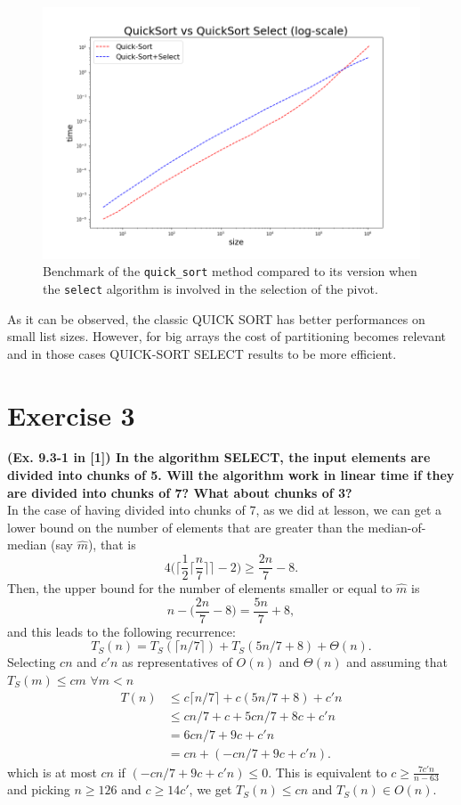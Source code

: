 \documentclass{article}
\begin{document}
	\begin{figure}[h]
		\centering
		\includegraphics[width=.8\textwidth]{../plot/quicksort.png}  
		\caption{Benchmark of the \texttt{quick\_sort} method compared to its version when the \texttt{select} algorithm is involved in the selection of the pivot.}
		\label{plot}
	\end{figure}
	
	\noindent As it can be observed, the classic QUICK SORT has better performances on small list sizes. However, for big arrays the cost of partitioning becomes relevant and in those cases QUICK-SORT SELECT results to be more efficient.
	
	
	\section*{Exercise 3}
	\textbf{(Ex. 9.3-1 in [1]) In the algorithm SELECT, the input elements are divided into chunks of 5. Will the algorithm work in linear time if they are divided into chunks of 7? What about chunks of 3?} \\
	
	\noindent In the case of having divided into chunks of 7, as we did at lesson, we can get a lower bound on the number of elements that are greater than the median-of-median (say $\hat{m}$), that is 
	$$
	4 \bigg(\bigg\lceil \frac{1}{2} \Big\lceil \frac{n}{7} \Big\rceil \bigg\rceil
	- 2 \bigg) \ge \frac{2n}{7} - 8.
	$$
	Then, the upper bound for the number of elements smaller or equal to $\hat{m}$ is 
	$$
	n-\Big(\frac{2n}{7} - 8\Big) = \frac{5n}{7} +8,
	$$
	and this leads to the following recurrence:
	$$
	T_S(n)=T_S(\lceil n/7 \rceil) + T_S(5n/7 + 8) + \Theta(n).
	$$
	Selecting $cn$ and $c'n$ as representatives of $O(n)$ and $\Theta(n)$ and assuming that $T_S(m) \leq cm$ $\forall m < n$ 
	\begin{align}
	\nonumber
	T(n) & \le c\lceil n/7 \rceil + c(5n/7 + 8) + c'n \\
	\nonumber
	& \le cn/7 + c + 5cn/7 + 8c + c'n \\
	\nonumber
	& = 6cn/7 + 9c + c'n \\
	\nonumber
	& = cn + (-cn/7 + 9c + c'n). 
	\end{align}
	which is at most $cn$ if $ (-cn/7 + 9c + c'n) \le 0 $. This is equivalent to $ c \ge \frac{7c'n}{n - 63}$ and picking $n\geq 126$ and $c\geq 14c'$, we get $T_S(n) \leq cn$ and $T_S(n) \in O(n)$.
	\\
	
\end{document}
